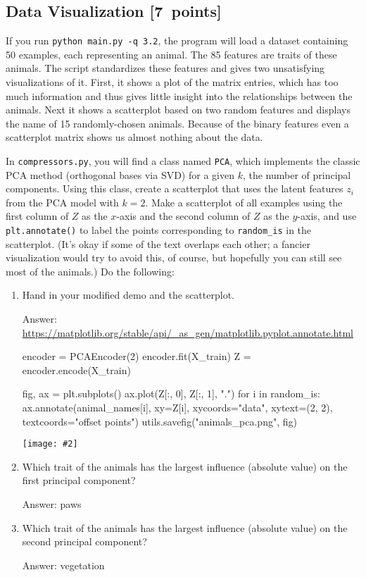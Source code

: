 \documentclass{article}
\newcommand{\blu}[1]{{\textcolor{blu}{#1}}}
\newenvironment{answer}{\par\begingroup\color{gre}Answer: }{\endgroup}
\let\ask\blu
\newcommand\pts[1]{\textcolor{pointscolour}{[#1~points]}}
\newcommand{\centerfig}[2]{\begin{center}\texttt{[image: \#2]}\end{center}}
\begin{document}
\subsection{Data Visualization \pts{7}}

If you run \verb|python main.py -q 3.2|, the program will load a dataset containing 50 examples, each representing an animal.
The 85 features are traits of these animals.
The script standardizes these features and gives two unsatisfying visualizations of it.
First, it shows a plot of the matrix entries, which has too much information and thus gives little insight into the relationships between the animals.
Next it shows a scatterplot based on two random features and displays the name of 15 randomly-chosen animals.
Because of the binary features even a scatterplot matrix shows us almost nothing about the data.

In \texttt{compressors.py}, you will find a class named \texttt{PCA}, which implements the classic PCA method (orthogonal bases via SVD) for a given $k$, the number of principal components. Using this class, create a scatterplot that uses the latent features $z_i$ from the PCA model with $k=2$.
Make a scatterplot of all examples using the first column of $Z$ as the $x$-axis and the second column of $Z$ as the $y$-axis, and use \texttt{plt.annotate()} to label the points corresponding to \verb|random_is| in the scatterplot.
(It's okay if some of the text overlaps each other; a fancier visualization would try to avoid this, of course, but hopefully you can still see most of the animals.)
Do the following:

\begin{enumerate}
    \item  \ask{Hand in your modified demo and the scatterplot.}
\begin{answer}
\url{https://matplotlib.org/stable/api/_as_gen/matplotlib.pyplot.annotate.html}

\end{answer}

\begin{python}
encoder = PCAEncoder(2)
encoder.fit(X_train)
Z = encoder.encode(X_train)

fig, ax = plt.subplots()
ax.plot(Z[:, 0], Z[:, 1], ".")
for i in random_is:
    ax.annotate(animal_names[i],
                xy=Z[i], xycoords="data",
                xytext=(2, 2), textcoords="offset points")
utils.savefig("animals_pca.png", fig)
\end{python}
\centerfig{0.56}{figs/animals_pca}

    \item \ask{Which trait of the animals has the largest influence (absolute value) on the first principal component?}
    \begin{answer}
        paws
    \end{answer}

    \item \ask{Which trait of the animals has the largest influence (absolute value) on the second principal component?}
    \begin{answer}
        vegetation
    \end{answer}
\end{enumerate}
\end{document}
